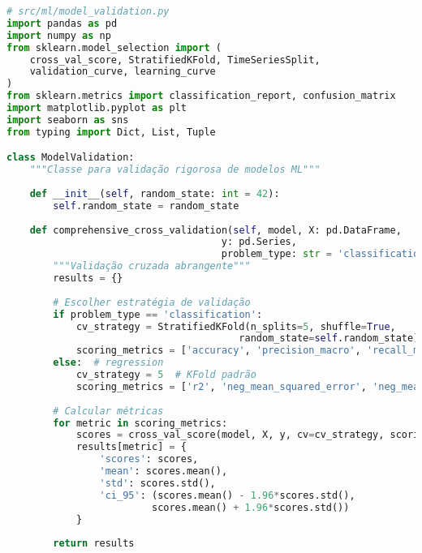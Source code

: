 \begin{pythonbox}
\begin{lstlisting}[language=Python]
# src/ml/model_validation.py
import pandas as pd
import numpy as np
from sklearn.model_selection import (
    cross_val_score, StratifiedKFold, TimeSeriesSplit,
    validation_curve, learning_curve
)
from sklearn.metrics import classification_report, confusion_matrix
import matplotlib.pyplot as plt
import seaborn as sns
from typing import Dict, List, Tuple

class ModelValidation:
    """Classe para validação rigorosa de modelos ML"""
    
    def __init__(self, random_state: int = 42):
        self.random_state = random_state
        
    def comprehensive_cross_validation(self, model, X: pd.DataFrame, 
                                     y: pd.Series, 
                                     problem_type: str = 'classification') -> Dict:
        """Validação cruzada abrangente"""
        results = {}
        
        # Escolher estratégia de validação
        if problem_type == 'classification':
            cv_strategy = StratifiedKFold(n_splits=5, shuffle=True, 
                                        random_state=self.random_state)
            scoring_metrics = ['accuracy', 'precision_macro', 'recall_macro', 'f1_macro']
        else:  # regression
            cv_strategy = 5  # KFold padrão
            scoring_metrics = ['r2', 'neg_mean_squared_error', 'neg_mean_absolute_error']
        
        # Calcular métricas
        for metric in scoring_metrics:
            scores = cross_val_score(model, X, y, cv=cv_strategy, scoring=metric)
            results[metric] = {
                'scores': scores,
                'mean': scores.mean(),
                'std': scores.std(),
                'ci_95': (scores.mean() - 1.96*scores.std(), 
                         scores.mean() + 1.96*scores.std())
            }
        
        return results
\end{lstlisting}
\end{pythonbox}
